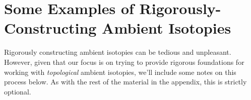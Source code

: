 


\section{Some Examples of Rigorously-Constructing Ambient
  Isotopies}\label{sec:rigorous-ambient-isotopy}
\def\figdir{figures/infinite-gauss-sequence/}

Rigorously constructing ambient isotopies can be tedious and
unpleasant. However, given that our focus is on trying to provide
rigorous foundations for working with \emph{topological} ambient
isotopies, we'll include some notes on this process below. As with the
rest of the material in the appendix, this is strictly optional.

